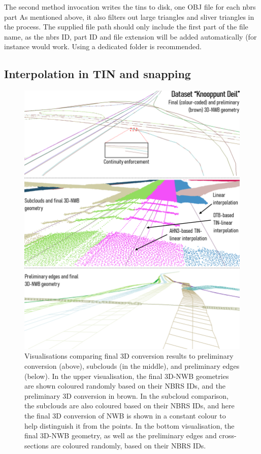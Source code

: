 The second method invocation writes the \ac{tin}s to disk, one OBJ file for each \ac{nbrs} part As mentioned above, it also filters out large triangles and sliver triangles in the process. The supplied file path should only include the first part of the file name, as the \ac{nbrs} ID, part ID and file extension will be added automatically (for instance  would work. Using a dedicated folder is recommended.

\subsection{Interpolation in TIN and snapping}
\label{sub:r_interpolation}

\begin{figure}
    \centering
    \includegraphics[width=\linewidth]{final_report/figs/elevationinterpolation0.png}
    \caption[Visualisations comparing final 3D-NWB geometries with intermediate results]{Visualisations comparing final 3D conversion results to preliminary conversion (above), subclouds (in the middle), and preliminary edges (below). In the upper visualisation, the final 3D-NWB geometries are shown coloured randomly based on their NBRS IDs, and the preliminary 3D conversion in brown. In the subcloud comparison, the subclouds are also coloured based on their NBRS IDs, and here the final 3D conversion of NWB is shown in a constant colour to help distinguish it from the points. In the bottom visualisation, the final 3D-NWB geometry, as well as the preliminary edges and cross-sections are coloured randomly, based on their NBRS IDs.}
    \label{fig:elevationinterpolation0}
\end{figure}

